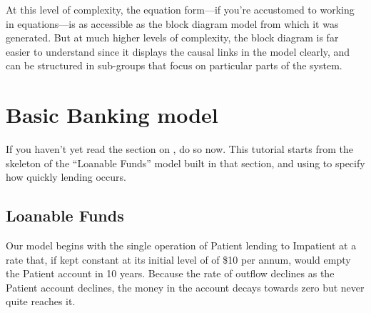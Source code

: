 At this level of complexity, the equation form---if you're accustomed
to working in equations---is as accessible as the block diagram model
from which it was generated. But at much higher levels of complexity,
the block diagram is far easier to understand since it displays the
causal links in the model clearly, and can be structured in sub-groups
that focus on particular parts of the system.

\section{Basic Banking model}

\label{tut:basicBankModel}

If you haven't yet read the section on , do so now. This tutorial starts from
the skeleton of the ``Loanable Funds'' model built in that section,
and using  to specify
how quickly lending occurs.

\subsection{Loanable Funds}

Our model begins with the single operation of Patient lending to Impatient
at a rate that, if kept constant at its initial level of of \$10 per
annum, would empty the Patient account in 10 years. Because the rate
of outflow declines as the Patient account declines, the money in
the account decays towards zero but never quite reaches it.


\begin{center}
\par\end{center}

